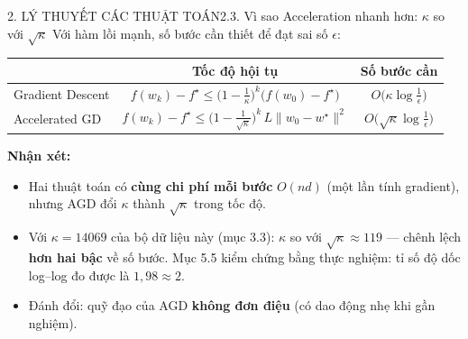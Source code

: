 \documentclass[aspectratio=169,11pt]{beamer}
\newcommand{\nx}{\textbf{Nhận xét:}}
\newcommand{\wstar}{w^{\star}}
\newcommand{\norm}[1]{\lVert #1 \rVert}
\begin{document}
\begin{frame}{2. LÝ THUYẾT CÁC THUẬT TOÁN}{2.3. Vì sao Acceleration nhanh hơn: $\kappa$ so với $\sqrt\kappa$}
  \small
  Với hàm lồi mạnh, số bước cần thiết để đạt sai số $\epsilon$:
  \begin{center}
  \begin{tabular}{lcc}
    \toprule
    & Tốc độ hội tụ & Số bước cần\\
    \midrule
    Gradient Descent & $f(w_k)-f^\star\le\big(1-\tfrac{1}{\kappa}\big)^k\big(f(w_0)-f^\star\big)$
                     & $O\big(\kappa\log\tfrac1\epsilon\big)$\\
    Accelerated GD   & $f(w_k)-f^\star\le\big(1-\tfrac{1}{\sqrt\kappa}\big)^k\,L\norm{w_0-\wstar}^2$
                     & $O\big(\sqrt\kappa\log\tfrac1\epsilon\big)$\\
    \bottomrule
  \end{tabular}
  \end{center}
  \vspace{6pt}
  \nx{}
  \begin{itemize}
    \item Hai thuật toán có \textbf{cùng chi phí mỗi bước} $O(nd)$ (một lần tính gradient), nhưng
          AGD đổi $\kappa$ thành $\sqrt\kappa$ trong tốc độ.
    \item Với $\kappa=\num{14069}$ của bộ dữ liệu này (mục 3.3): $\kappa$ so với
          $\sqrt\kappa\approx119$ — chênh lệch \textbf{hơn hai bậc} về số bước. Mục 5.5 kiểm
          chứng bằng thực nghiệm: tỉ số độ dốc log--log đo được là $1{,}98\approx2$.
    \item Đánh đổi: quỹ đạo của AGD \textbf{không đơn điệu} (có dao động nhẹ khi gần nghiệm).
  \end{itemize}
\end{frame}
\end{document}
